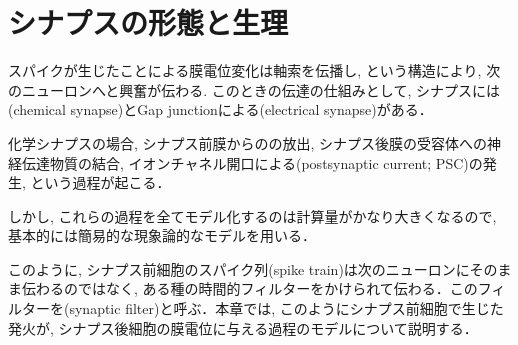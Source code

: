 \section{シナプスの形態と生理
}
スパイクが生じたことによる膜電位変化は軸索を伝播し, \textbf{}という構造により, 次のニューロンへと興奮が伝わる. このときの伝達の仕組みとして, シナプスには\textbf{}(chemical synapse)とGap junctionによる\textbf{}(electrical synapse)がある．  



化学シナプスの場合, シナプス前膜からの\textbf{}の放出, シナプス後膜の受容体への神経伝達物質の結合, イオンチャネル開口による\textbf{}(postsynaptic current; PSC)の発生, という過程が起こる．



しかし, これらの過程を全てモデル化するのは計算量がかなり大きくなるので, 基本的には簡易的な現象論的なモデルを用いる．



このように, シナプス前細胞のスパイク列(spike train)は次のニューロンにそのまま伝わるのではなく, ある種の時間的フィルターをかけられて伝わる．このフィルターを\textbf{}(synaptic filter)と呼ぶ．本章では, このようにシナプス前細胞で生じた発火が, シナプス後細胞の膜電位に与える過程のモデルについて説明する．



